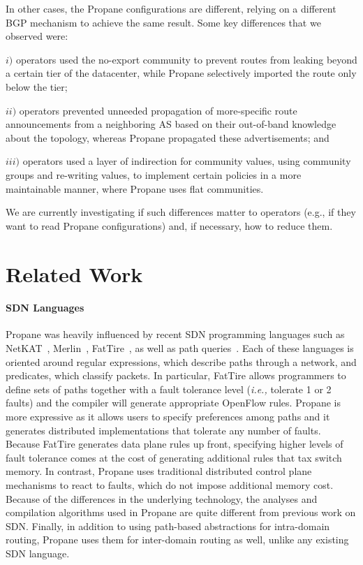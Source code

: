 \documentclass{sig-alternate-10pt}
\newcommand{\sysname}{{\small \sf Propane}\xspace}
\begin{document}
In other cases, the \sysname configurations are different, relying on a different BGP mechanism to achieve the same result. Some key differences that we observed were:

$i)$ operators used the no-export community to prevent routes from leaking beyond a certain tier of the datacenter, while \sysname selectively imported the route only below the tier;

$ii)$ operators prevented unneeded propagation of more-specific route announcements from a neighboring AS based on their out-of-band knowledge about the topology, whereas \sysname propagated these advertisements; and

$iii)$ operators used a layer of indirection for community values, using community groups and re-writing values, to implement certain policies in a more maintainable manner, where \sysname uses flat communities.


We are currently investigating if such differences matter to operators (e.g., if they want to read \sysname configurations) and, if necessary, how to reduce them.




%
%
%
%

\section{Related Work}
\label{sec:related}

\paragraph*{SDN Languages}
\sysname{} was heavily influenced by recent SDN programming
languages such as NetKAT~\cite{netkat}, Merlin~\cite{foster:merlin}, FatTire~\cite{fattire}, 
as well as path queries~\cite{queries}.
Each of these languages is oriented around regular expressions, which
describe paths through a network, and predicates, which classify packets.
In particular, FatTire allows programmers to define sets of paths together
with a fault tolerance level (\emph{i.e.,} tolerate 1 or 2 faults)
and the compiler will generate appropriate OpenFlow rules.
\sysname is more expressive as it allows users to specify preferences among
paths and it generates distributed implementations that tolerate any number of faults. 
Because FatTire generates data plane rules up front, 
specifying higher levels of fault tolerance comes
at the cost of generating additional rules that tax switch memory.  
In contrast, \sysname uses traditional distributed
control plane mechanisms to react to faults, which do not impose additional memory cost.
Because of the differences in the underlying technology, the analyses
and compilation algorithms used in \sysname are quite different from
previous work on SDN. 
Finally, in addition to using path-based abstractions
for intra-domain routing, \sysname uses them for inter-domain routing as
well, unlike any existing SDN language.
\end{document}
